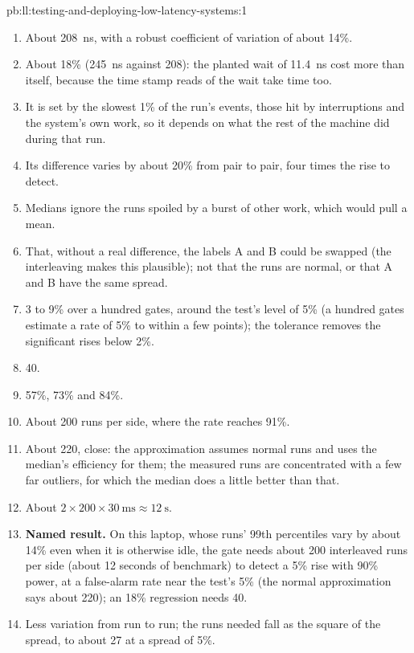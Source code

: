 \begin{solution}{pb:ll:testing-and-deploying-low-latency-systems:1}
\begin{enumerate}
\item About \qty{208}{\nano\second}, with a robust coefficient of variation of about 14\%.
\item About 18\% (\qty{245}{\nano\second} against 208): the planted wait of \qty{11.4}{\nano\second} cost more than itself,
because the time stamp reads of the wait take time too.
\item It is set by the slowest 1\% of the run's events, those hit by interruptions and the system's own work, so it depends on
what the rest of the machine did during that run.
\item Its difference varies by about 20\% from pair to pair, four times the rise to detect.
\item Medians ignore the runs spoiled by a burst of other work, which would pull a mean.
\item That, without a real difference, the labels A and B could be swapped (the interleaving makes this plausible); not that
the runs are normal, or that A and B have the same spread.
\item 3 to 9\% over a hundred gates, around the test's level of 5\% (a hundred gates estimate a rate of 5\% to within a few
points); the tolerance removes the significant rises below 2\%.
\item 40.
\item 57\%, 73\% and 84\%.
\item About 200 runs per side, where the rate reaches 91\%.
\item About 220, close: the approximation assumes normal runs and uses the median's efficiency for them; the measured runs
are concentrated with a few far outliers, for which the median does a little better than that.
\item About $2 \times 200 \times \qty{30}{\milli\second} \approx \qty{12}{\second}$.
\item \textbf{Named result.} On this laptop, whose runs' 99th percentiles vary by about 14\% even when it is otherwise idle,
the gate needs about 200 interleaved runs per side (about 12 seconds of benchmark) to detect a 5\% rise with 90\% power, at a
false-alarm rate near the test's 5\% (the normal approximation says about 220); an 18\% regression needs 40.
\item Less variation from run to run; the runs needed fall as the square of the spread, to about 27 at a spread of 5\%.

\end{enumerate}
\end{solution}
